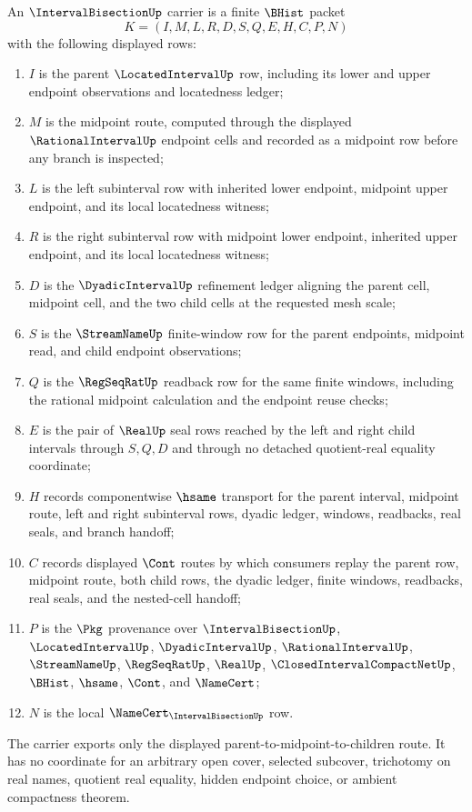 \begin{definition}
\label{def:interval-bisection-carrier}
An $\IntervalBisectionUp$ carrier is a finite $\BHist$ packet
$$
K=(I,M,L,R,D,S,Q,E,H,C,P,N)
$$
with the following displayed rows:
\begin{enumerate}
\item $I$ is the parent $\LocatedIntervalUp$ row, including its lower and upper endpoint observations and locatedness ledger;
\item $M$ is the midpoint route, computed through the displayed $\RationalIntervalUp$ endpoint cells and recorded as a midpoint row before any branch is inspected;
\item $L$ is the left subinterval row with inherited lower endpoint, midpoint upper endpoint, and its local locatedness witness;
\item $R$ is the right subinterval row with midpoint lower endpoint, inherited upper endpoint, and its local locatedness witness;
\item $D$ is the $\DyadicIntervalUp$ refinement ledger aligning the parent cell, midpoint cell, and the two child cells at the requested mesh scale;
\item $S$ is the $\StreamNameUp$ finite-window row for the parent endpoints, midpoint read, and child endpoint observations;
\item $Q$ is the $\RegSeqRatUp$ readback row for the same finite windows, including the rational midpoint calculation and the endpoint reuse checks;
\item $E$ is the pair of $\RealUp$ seal rows reached by the left and right child intervals through $S,Q,D$ and through no detached quotient-real equality coordinate;
\item $H$ records componentwise $\hsame$ transport for the parent interval, midpoint route, left and right subinterval rows, dyadic ledger, windows, readbacks, real seals, and branch handoff;
\item $C$ records displayed $\Cont$ routes by which consumers replay the parent row, midpoint route, both child rows, the dyadic ledger, finite windows, readbacks, real seals, and the nested-cell handoff;
\item $P$ is the $\Pkg$ provenance over $\IntervalBisectionUp$, $\LocatedIntervalUp$, $\DyadicIntervalUp$, $\RationalIntervalUp$, $\StreamNameUp$, $\RegSeqRatUp$, $\RealUp$, $\ClosedIntervalCompactNetUp$, $\BHist$, $\hsame$, $\Cont$, and $\NameCert$;
\item $N$ is the local $\NameCert_{\IntervalBisectionUp}$ row.
\end{enumerate}
The carrier exports only the displayed parent-to-midpoint-to-children route. It has no coordinate for an arbitrary open cover, selected subcover, trichotomy on real names, quotient real equality, hidden endpoint choice, or ambient compactness theorem.
\end{definition}

